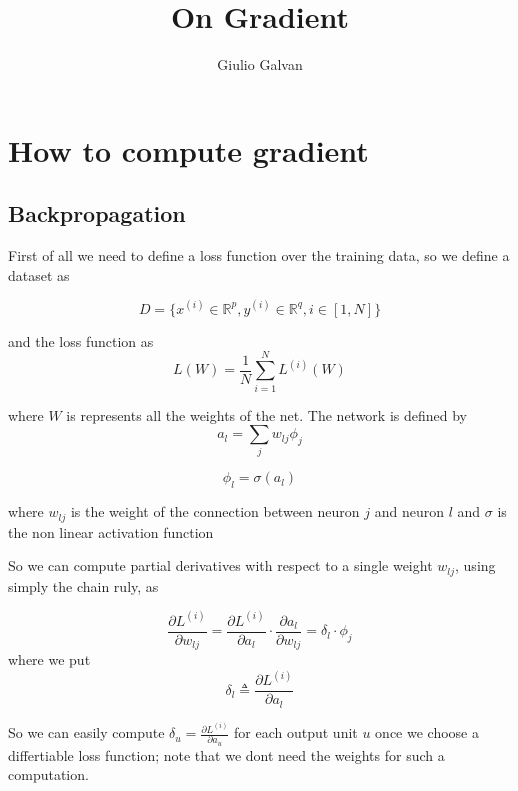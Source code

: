\documentclass{article}
\title{On Gradient}
\author{Giulio Galvan}
\begin{document}
\maketitle

\begin{abstract}
\end{abstract}

\section{How to compute gradient}
\subsection{Backpropagation}

First of all we need to define a loss function over the training data, so we define a dataset as 

\begin{equation}
D=\{x^{(i)} \in \mathbb{R}^p, y^{(i)} \in \mathbb{R}^q,  i\in[1,N]\}
\end{equation}

and the loss function as
\begin{equation}
L(W)=\frac{1}{N}\sum_{i=1}^N L^{(i)}(W) 
\end{equation}

where $W$ is represents all the weights of the net.
The network is defined by
\begin{equation}
a_l = \sum_j w_{lj}\phi_j
\end{equation}

\begin{equation}
\phi_l = \sigma(a_l)
\end{equation}


where $w_{lj}$ is the weight of the connection between neuron $j$ and neuron $l$ and $\sigma$ is the non linear activation function

So we can compute partial derivatives with respect to a single weight $w_{lj}$, using simply the chain ruly, as 

$$\frac{\partial L^{(i)}}{\partial w_{lj}}=\frac{\partial L^{(i)}}{\partial a_l} \cdot \frac{\partial a_l}{\partial w_{lj}}=\delta_l \cdot \phi_j$$
where we put 
$$\delta_l \triangleq \frac{\partial L^{(i)}}{\partial a_l}$$


So we can easily compute $\delta_u = \frac{\partial L^{(i)}}{\partial a_u} $ for each output unit $u$ once we choose a differtiable loss function; note
that we dont need the weights for such a computation. 
\end{document}
